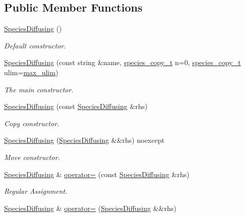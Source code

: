 \subsection*{Public Member Functions}
\begin{DoxyCompactItemize}
\item 
\hyperlink{classSpeciesDiffusing_a0b504aab6af768c9f5e93d8675bad2c8}{Species\+Diffusing} ()
\begin{DoxyCompactList}\small\item\em Default constructor. \end{DoxyCompactList}\item 
\hyperlink{classSpeciesDiffusing_a3da06d6d20e94c627d0acb10d507265f}{Species\+Diffusing} (const string \&name, \hyperlink{common_8h_a3503f321fd36304ee274141275cca586}{species\+\_\+copy\+\_\+t} n=0, \hyperlink{common_8h_a3503f321fd36304ee274141275cca586}{species\+\_\+copy\+\_\+t} ulim=\hyperlink{common_8h_adaf831a0b61083f29adf8fc6e8edab35}{max\+\_\+ulim})
\begin{DoxyCompactList}\small\item\em The main constructor. \end{DoxyCompactList}\item 
\hyperlink{classSpeciesDiffusing_a0355b1cdd743b527347f269ffb5bc8ae}{Species\+Diffusing} (const \hyperlink{classSpeciesDiffusing}{Species\+Diffusing} \&rhs)
\begin{DoxyCompactList}\small\item\em Copy constructor. \end{DoxyCompactList}\item 
\hyperlink{classSpeciesDiffusing_ac6db6f3ef60f4cb9b3e842350ff0af27}{Species\+Diffusing} (\hyperlink{classSpeciesDiffusing}{Species\+Diffusing} \&\&rhs) noexcept
\begin{DoxyCompactList}\small\item\em Move constructor. \end{DoxyCompactList}\item 
\hyperlink{classSpeciesDiffusing}{Species\+Diffusing} \& \hyperlink{classSpeciesDiffusing_aaad12221feed8486a0b07d358105e4fb}{operator=} (const \hyperlink{classSpeciesDiffusing}{Species\+Diffusing} \&rhs)
\begin{DoxyCompactList}\small\item\em Regular Assignment. \end{DoxyCompactList}\item 
\hyperlink{classSpeciesDiffusing}{Species\+Diffusing} \& \hyperlink{classSpeciesDiffusing_a4439f2e8612da24e0c7ae83810af8490}{operator=} (\hyperlink{classSpeciesDiffusing}{Species\+Diffusing} \&\&rhs)

\end{DoxyCompactItemize}
